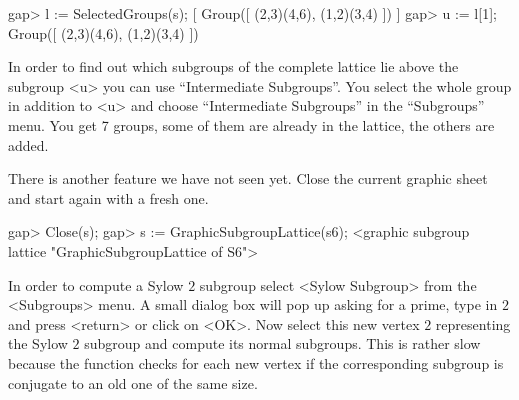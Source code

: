 \begintt
gap> l := SelectedGroups(s);
[ Group([ (2,3)(4,6), (1,2)(3,4) ]) ]
gap> u := l[1];
Group([ (2,3)(4,6), (1,2)(3,4) ])
\endtt

In order  to find out which subgroups  of the complete lattice  lie above
the subgroup <u> you can  use ``Intermediate Subgroups''. You select the
whole group in addition to <u> and choose ``Intermediate Subgroups'' in the 
``Subgroups'' menu. You get 7 groups, some of them are already in the
lattice, the others are added.

There is another feature we have not seen yet.  Close the current graphic
sheet and start again with a fresh one.

\begintt
gap> Close(s);
gap> s := GraphicSubgroupLattice(s6);
<graphic subgroup lattice "GraphicSubgroupLattice of S6">
\endtt

In order to compute a Sylow $2$ subgroup select <Sylow Subgroup> from the
<Subgroups> menu.   A small dialog box  will  pop up asking  for a prime,
type in  $2$ and press <return> or  click on <OK>.   Now select  this new
vertex $2$   representing the Sylow $2$  subgroup  and compute its normal
subgroups.  This is rather slow because the  function checks for each new
vertex if the corresponding  subgroup is conjugate to  an old one  of the
same size.  


%
%
%
%

